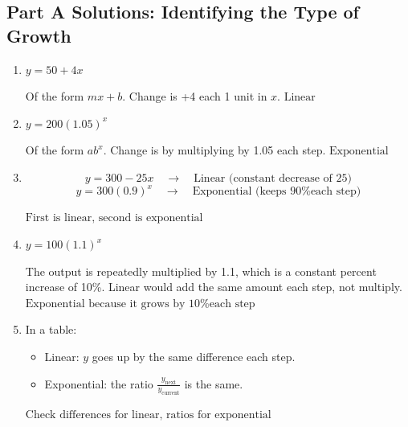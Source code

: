 \documentclass[14pt]{extarticle}
\begin{document}
\subsection*{Part A Solutions: Identifying the Type of Growth}
\begin{enumerate}
  \item \(y = 50 + 4x\)

  Of the form \(mx + b\). Change is +4 each 1 unit in \(x\).  
  \(\boxed{\text{Linear}}\)

  \item \(y = 200(1.05)^x\)

  Of the form \(a b^x\). Change is by multiplying by 1.05 each step.  
  \(\boxed{\text{Exponential}}\)

  \item
  \[
  y = 300 - 25x \quad \rightarrow \quad \text{Linear (constant decrease of 25)}
  \]
  \[
  y = 300(0.9)^x \quad \rightarrow \quad \text{Exponential (keeps 90\% each step)}
  \]

  \(\boxed{\text{First is linear, second is exponential}}\)

  \item \(y = 100(1.1)^x\)

  The output is repeatedly multiplied by 1.1, which is a constant percent increase of 10\%.  
  Linear would add the same amount each step, not multiply.  \newline
  \(\boxed{\text{Exponential because it grows by 10\% each step}}\)

  \item In a table:
  \begin{itemize}
    \item Linear: \(y\) goes up by the same difference each step.
    \item Exponential: the ratio \(\frac{y_{\text{next}}}{y_{\text{current}}}\) is the same.
  \end{itemize}

  \(\boxed{\text{Check differences for linear, ratios for exponential}}\)
\end{enumerate}
\end{document}
